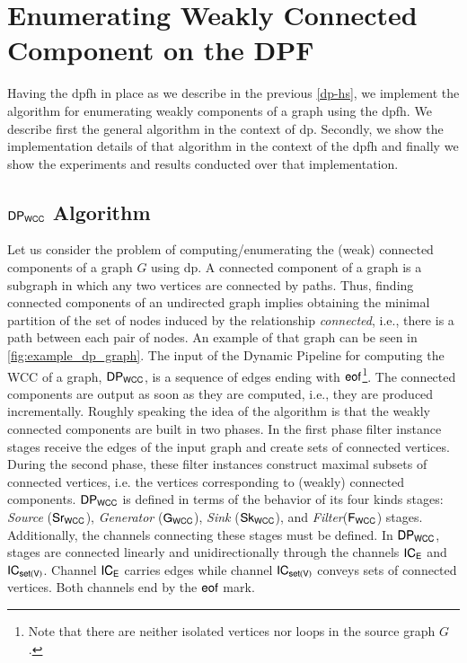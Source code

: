 \section{Enumerating Weakly Connected Component on the DPF}\label{sec:wcc-dpf}

Having the \acrshort{dpfh} in place as we describe in the previous \autoref{dp-hs}, we implement the algorithm for enumerating weakly components of a graph using the \acrshort{dpfh}.
We describe first the general algorithm in the context of \acrshort{dp}.
Secondly, we show the implementation details of that algorithm in the context of the \acrshort{dpfh} and finally we show the experiments and results conducted over that implementation.

\subsection{\texorpdfstring{$\mathsf{DP_{WCC}}$}{Lg} Algorithm}\label{sub:sec:wcc:algo}
Let us consider the problem of computing/enumerating the (weak) connected components of a graph $G$ using \acrshort{dp}. 
A connected component of a graph is a subgraph in which any two vertices are connected by paths.  
Thus, finding connected components of an undirected graph implies obtaining the minimal partition of the set of nodes induced by the relationship \textit{connected}, i.e., there is a path between each pair of nodes. 
An example of that graph can be seen in \autoref{fig:example_dp_graph}.
The input of the Dynamic Pipeline for computing the WCC of a graph, $\mathsf{DP_{WCC}}$, is a sequence of edges ending with $\mathsf{eof}$\footnote{Note that there are neither isolated vertices nor loops in the source graph $G$.}. 
The connected components are output as soon as they are computed, i.e., they are produced incrementally. 
Roughly speaking the idea of the algorithm is that the weakly connected components are built in two phases. 
In the first phase filter instance stages receive the edges of the input graph and create sets of connected vertices. 
During the second phase, these filter instances construct maximal subsets of connected vertices, i.e. the vertices corresponding to (weakly) connected components.
%
$\mathsf{DP_{WCC}}$ is defined in terms of the behavior of its four kinds stages: \textit{Source} ($\mathsf{Sr_{WCC}}$),  \textit{Generator} ($\mathsf{G_{WCC}}$),  \textit{Sink} ($\mathsf{Sk_{WCC}}$), and \textit{Filter}($\mathsf{F_{WCC}}$) stages. Additionally,  the channels connecting these stages must be defined. 
In $\mathsf{DP_{WCC}}$, stages are connected linearly and unidirectionally through the channels $\mathsf{IC_E}$ and  $\mathsf{IC_{set(V)}}$. Channel $\mathsf{IC_E}$ carries edges while channel  $\mathsf{IC_{set(V)}}$ conveys sets of connected vertices. Both channels end by the $\mathsf{eof}$ mark. 
